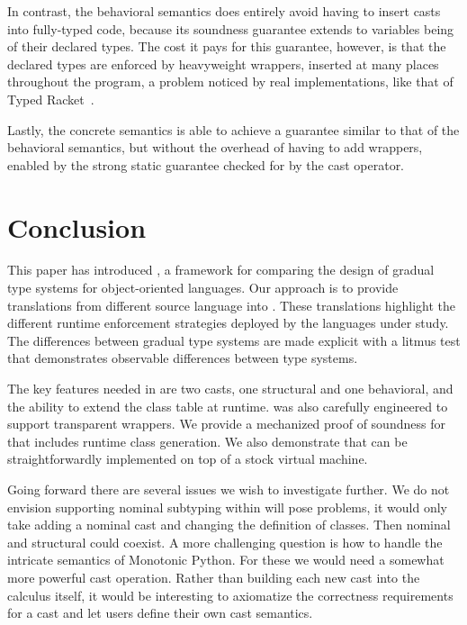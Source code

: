 \documentclass[runnningheads]{tex/llncs}
\begin{document}
In contrast, the behavioral semantics does entirely avoid having to insert
casts into fully-typed code, because its soundness guarantee extends to
variables being of their declared types. The cost it pays for this guarantee,
however, is that the declared types are enforced by heavyweight wrappers,
inserted at many places throughout the program, a problem noticed by real
implementations, like that of Typed Racket~\cite{popl16}.

Lastly, the concrete semantics is able to achieve a guarantee similar to that
of the behavioral semantics, but without the overhead of having to add
wrappers, enabled by the strong static guarantee checked for by the cast
operator.

\section{Conclusion}\label{litm}

This paper has introduced \kafka, a framework for comparing the design of
gradual type systems for object-oriented languages. Our approach is to
provide translations from different source language into \kafka. These
translations highlight the different runtime enforcement strategies deployed
by the languages under study. The differences between gradual type systems
are made explicit with a litmus test that demonstrates observable
differences between type systems.

The key features needed in \kafka are two casts, one structural and 
one behavioral, and the ability to extend the class table at runtime.
\kafka was also carefully engineered to support transparent wrappers.  We
provide a mechanized proof of soundness for \kafka that includes runtime
class generation.  We also demonstrate that \kafka can be straightforwardly
implemented on top of a stock virtual machine.

Going forward there are several issues we wish to investigate further.  We do
not envision supporting nominal subtyping within \kafka will pose
problems, it would only take adding a nominal cast and changing the
definition of classes. Then nominal and structural could coexist. A more
challenging question is how to handle the intricate semantics of Monotonic
Python. For these we would need a somewhat more powerful cast operation.
Rather than building each new cast into the calculus itself, it would be
interesting to axiomatize the correctness requirements for a cast and let
users define their own cast semantics. 
\end{document}
